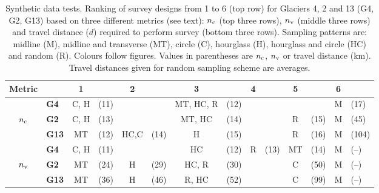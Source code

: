 \documentclass[twocolumn,letterpaper]{igs}
\begin{document}
\begin{table}[]
\centering
\caption{Synthetic data tests. Ranking of survey designs from 1 to 6 (top row) for Glaciers 4, 2 and 13 (G4, G2, G13) based on three different metrics (see text): $n_{\rm c}$ (top three rows), $n_{\rm v}$ (middle three rows) and travel distance ($d$) required to perform survey (bottom three rows). Sampling patterns are: midline (M), midline and transverse (MT), circle (C), hourglass (H), hourglass and circle (HC) and random (R). Colours follow figures. Values in parentheses are $n_{\rm c}$, $n_{\rm v}$ or travel distance (km). Travel distances given for random sampling scheme are averages.}
\label{tab:SynthPatternRanks}
\begin{tabular}{clclclclclclcl}
\hline
 Metric         && \textbf{1} && \textbf{2} && \textbf{3} && \textbf{4} && \textbf{5} && \textbf{6} \\
 \hline
                & \textbf{G4}    & \textcolor{C}{C}, \textcolor{H}{H}         & (11)         &          &         &  \textcolor{MT}{MT}, \textcolor{HC}{HC}, \textcolor{R}{R}         & (12)         &          &           &          &  & \textcolor{M}{M} & (17) \\
$n_{\rm c}$         & \textbf{G2}   & \textcolor{C}{C}, \textcolor{H}{H}         & (13)         &          &           & \textcolor{MT}{MT}, \textcolor{HC}{HC}         & (14)         &          &          & \textcolor{R}{R}         & (15) & \textcolor{M}{M} & (45) \\
                & \textbf{G13} & \textcolor{MT}{MT}         & (12)         & \textcolor{HC}{HC},\textcolor{C}{C} & (14)         &  \textcolor{H}{H}                 & (15)         &                  &           & \textcolor{R}{R}         & (16) & \textcolor{M}{M} & (104) \\
\hline
                & \textbf{G4}   & \textcolor{C}{C},  \textcolor{H}{H}         & (11)         &         &           & \textcolor{HC}{HC}         & (12)         & \textcolor{R}{R}                 & (13)         & \textcolor{MT}{MT} & (14) & \textcolor{M}{M} & (--) \\
$n_{\rm v}$         & \textbf{G2}   & \textcolor{MT}{MT}         & (24)         & \textcolor{H}{H}         & (29)         & \textcolor{HC}{HC},  \textcolor{R}{R}         & (30)        &                  &         &  \textcolor{C}{C}         & (50) & \textcolor{M}{M} & (--) \\
                & \textbf{G13} & \textcolor{MT}{MT}         & (36)         & \textcolor{H}{H}         & (46)         & \textcolor{R}{R}, \textcolor{HC}{HC}                 & (52)         &         &          & \textcolor{C}{C}         & (99) & \textcolor{M}{M} & (--) \\

\end{tabular}
\end{table}
\end{document}
